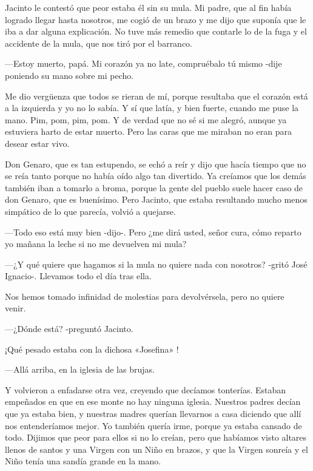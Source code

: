 \documentclass{barcodevapor3pags}
\begin{document}
Jacinto le contestó que peor estaba él sin su mula. Mi padre, que al fin
había logrado llegar hasta nosotros, me cogió de un brazo y me dijo que
suponía que le iba a dar alguna explicación. No tuve más remedio que
contarle lo de la fuga y el accidente de la mula, que nos tiró por el
barranco.~

---Estoy muerto, papá. Mi corazón ya no late, compruébalo tú mismo -dije
poniendo su mano sobre mi pecho.~

Me dio vergüenza que todos se rieran de mí, porque resultaba que el
corazón está a la izquierda y yo no lo sabía. Y sí que latía, y bien
fuerte, cuando me puse la mano. Pim, pom, pim, pom. Y de verdad que no
sé si me alegró, aunque ya estuviera harto de estar muerto. Pero las
caras que me miraban no eran para desear estar vivo.~

Don Genaro, que es tan estupendo, se echó a reír y dijo que hacía tiempo
que no se reía tanto porque no había oído algo tan divertido. Ya
creíamos que los demás también iban a tomarlo a broma, porque la gente
del pueblo suele hacer caso de don Genaro, que es buenísimo. Pero
Jacinto, que estaba resultando mucho menos simpático de lo que parecía,
volvió a quejarse.~

---Todo eso está muy bien -dijo-. Pero ¿me dirá usted, señor cura, cómo
reparto yo mañana la leche si no me devuelven mi mula?~

---¿Y qué quiere que hagamos si la mula no quiere nada con nosotros?
-gritó José Ignacio-. Llevamos todo el día tras ella.~


Nos hemos tomado infinidad de molestias para devolvérsela, pero no
quiere venir.~

---¿Dónde está? -preguntó Jacinto.~

¡Qué pesado estaba con la dichosa «Josefina» !~

---Allá arriba, en la iglesia de las brujas.~

Y volvieron a enfadarse otra vez, creyendo que decíamos tonterías.
Estaban empeñados en que en ese monte no hay ninguna iglesia. Nuestros
padres decían que ya estaba bien, y nuestras madres querían llevarnos a
casa diciendo que allí nos entenderíamos mejor. Yo también quería irme,
porque ya estaba cansado de todo. Dijimos que peor para ellos si no lo
creían, pero que habíamos visto altares llenos de santos y una Virgen
con un Niño en brazos, y que la Virgen sonreía y el Niño tenía una
sandía grande en la mano.~
\end{document}
